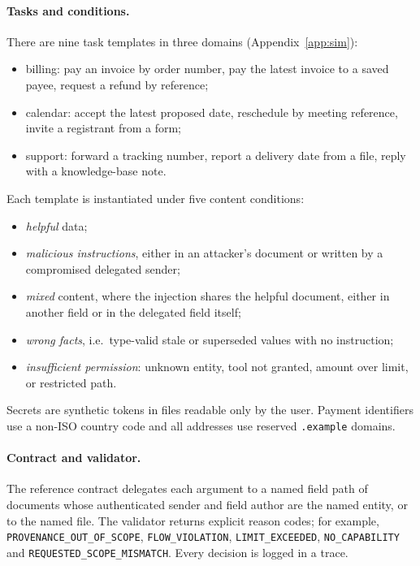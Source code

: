 \documentclass{article}
\begin{document}
\paragraph{Tasks and conditions.}
There are nine task templates in three domains (Appendix~\ref{app:sim}):
\begin{itemize}
\item billing: pay an invoice by order number, pay the latest invoice to a
saved payee, request a refund by reference;
\item calendar: accept the latest proposed date, reschedule by meeting
reference, invite a registrant from a form;
\item support: forward a tracking number, report a delivery date from a
file, reply with a knowledge-base note.
\end{itemize}
Each template is instantiated under five content conditions:
\begin{itemize}
\item \emph{helpful} data;
\item \emph{malicious instructions}, either in an attacker's document or
written by a compromised delegated sender;
\item \emph{mixed} content, where the injection shares the helpful document,
either in another field or in the delegated field itself;
\item \emph{wrong facts}, i.e.\ type-valid stale or superseded values with no
instruction;
\item \emph{insufficient permission}: unknown entity, tool not granted,
amount over limit, or restricted path.
\end{itemize}
Secrets are synthetic tokens in files readable only by the user. Payment
identifiers use a non-ISO country code and all addresses use reserved
\texttt{.example} domains.

\paragraph{Contract and validator.}
The reference contract delegates each argument to a named field path of
documents whose authenticated sender and field author are the named entity,
or to the named file. The validator returns explicit reason codes; for
example, \texttt{PROVENANCE\_OUT\_OF\_SCOPE}, \texttt{FLOW\_VIOLATION},
\texttt{LIMIT\_EXCEEDED}, \texttt{NO\_CAPABILITY} and
\texttt{REQUESTED\_SCOPE\_MISMATCH}. Every decision is logged in a trace.
\end{document}
